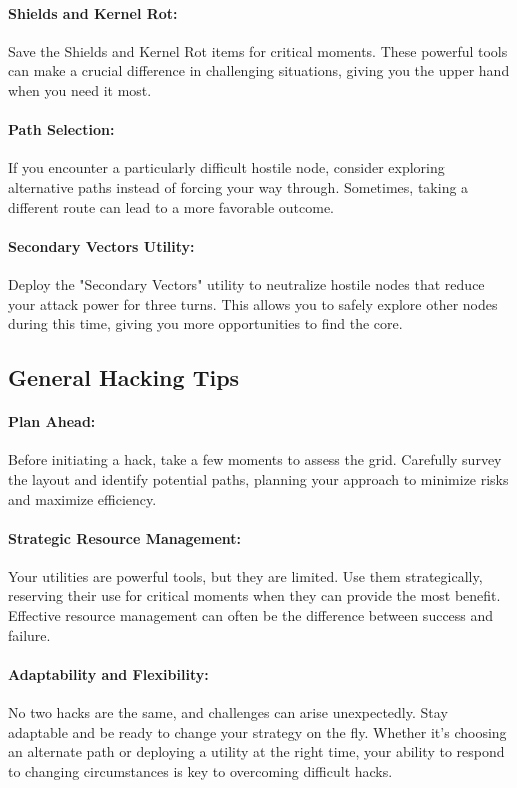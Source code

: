 \documentclass[a4paper,12pt]{report}
\begin{document}
\paragraph{Shields and Kernel Rot:} Save the Shields and Kernel Rot items for critical moments. These powerful tools can make a crucial difference in challenging situations, giving you the upper hand when you need it most.

\paragraph{Path Selection:} If you encounter a particularly difficult hostile node, consider exploring alternative paths instead of forcing your way through. Sometimes, taking a different route can lead to a more favorable outcome.

\paragraph{Secondary Vectors Utility:} Deploy the "Secondary Vectors" utility to neutralize hostile nodes that reduce your attack power for three turns. This allows you to safely explore other nodes during this time, giving you more opportunities to find the core.

\subsection{General Hacking Tips}

\paragraph{Plan Ahead:} Before initiating a hack, take a few moments to assess the grid. Carefully survey the layout and identify potential paths, planning your approach to minimize risks and maximize efficiency.

\paragraph{Strategic Resource Management:} Your utilities are powerful tools, but they are limited. Use them strategically, reserving their use for critical moments when they can provide the most benefit. Effective resource management can often be the difference between success and failure.

\paragraph{Adaptability and Flexibility:} No two hacks are the same, and challenges can arise unexpectedly. Stay adaptable and be ready to change your strategy on the fly. Whether it's choosing an alternate path or deploying a utility at the right time, your ability to respond to changing circumstances is key to overcoming difficult hacks.
\end{document}
